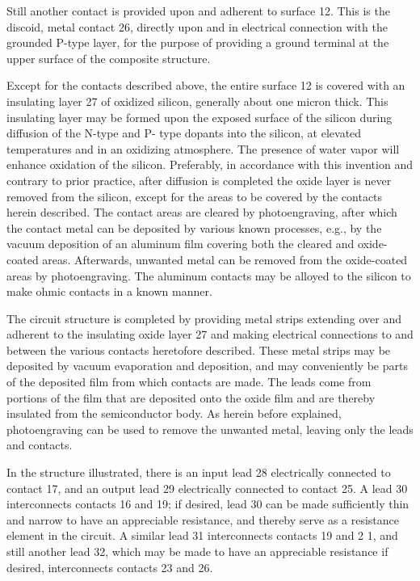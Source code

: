 Still another contact is provided upon and adherent to surface 12. This is the discoid, metal contact 26, directly upon and in electrical connection with the grounded P-type layer, for the purpose of providing a ground terminal at the upper surface of the composite structure.

Except for the contacts described above, the entire surface 12 is covered with an insulating layer 27 of oxidized silicon, generally about one micron thick. This insulating layer may be formed upon the exposed surface of the silicon during diffusion of the N-type and P- type dopants into the silicon, at elevated temperatures and in an oxidizing atmosphere. The presence of water vapor will enhance oxidation of the silicon. Preferably, in accordance with this invention and contrary to prior practice, after diffusion is completed the oxide layer is never removed from the silicon, except for the areas to be covered by the contacts herein described. The contact areas are cleared by photoengraving, after which the contact metal can be deposited by various known processes, e.g., by the vacuum deposition of an aluminum film covering both the cleared and oxide-coated areas. Afterwards, unwanted metal can be removed from the oxide-coated areas by photoengraving. The aluminum contacts may be alloyed to the silicon to make ohmic contacts in a known manner.

The circuit structure is completed by providing metal strips extending over and adherent to the insulating oxide layer 27 and making electrical connections to and between the various contacts heretofore described. These metal strips may be deposited by vacuum evaporation and deposition, and may conveniently be parts of the deposited film from which contacts are made. The leads come from portions of the film that are deposited onto the oxide film and are thereby insulated from the semiconductor body. As herein before explained, photoengraving can be used to remove the unwanted metal, leaving only the leads and contacts.

In the structure illustrated, there is an input lead 28 electrically connected to contact 17, and an output lead 29 electrically connected to contact 25. A lead 30 interconnects contacts 16 and 19; if desired, lead 30 can be made sufficiently thin and narrow to have an appreciable resistance, and thereby serve as a resistance element in the circuit. A similar lead 31 interconnects contacts 19 and 2 1, and still another lead 32, which may be made to have an appreciable resistance if desired, interconnects contacts 23 and 26.

